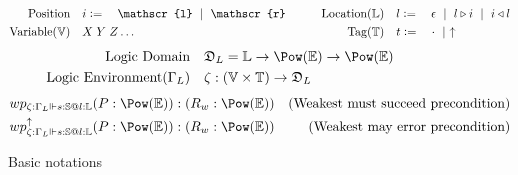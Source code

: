 \begin{figure}[t]
\begin{align*}
\begin{aligned}[c]
\mathrm{Position} \quad &i \metaDef \quad \mathscr{l} \cmid \mathscr{r}\\
\mathrm{Variable}(\mathbb{V}) \quad &X\; Y\; Z \dots
\end{aligned}
\quad\quad\quad
\begin{aligned}[c]
\mathrm{Location}(\mathbb{L}) \quad &l \metaDef \quad \epsilon \cmid l \triangleright i \cmid i \triangleleft l\\
\mathrm{Tag}(\mathbb{T}) \quad &t \metaDef \quad \cdot \cmid \uparrow
\end{aligned}
\end{align*}
\begin{align*}
    \text{Logic Domain}\quad&\mathfrak{D}_L = \mathbb{L} \to \Pow(\mathbb{E}) \to \Pow(\mathbb{E})\\
    \text{Logic Environment}(\Gamma_L) \quad &\zeta : (\mathbb{V} \times \mathbb{T}) \to \mathfrak{D}_L
\end{align*}
\begin{align*}
&wp_{\zeta: \Gamma_L \Vdash s:\mathbb{S} @l:\mathbb{L}} (P : \Pow(\mathbb{E})) : (R_w : \Pow(\mathbb{E})) &\text{(Weakest must succeed precondition)}\\
&wp_{\zeta: \Gamma_L \Vdash s:\mathbb{S} @l:\mathbb{L}}^\uparrow (P : \Pow(\mathbb{E})) : (R_w : \Pow(\mathbb{E})) &\text{(Weakest may error precondition)}
\end{align*}
\caption{Basic notations}
\label{chap4:wp:notations}
\end{figure}

